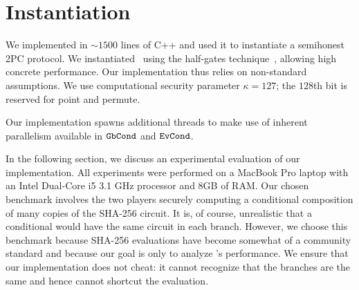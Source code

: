 \section{Instantiation}\label{sec:instantiation}

We implemented  \ourscheme in $\sim1500$ lines of C++ and used it to instantiate a semihonest 2PC protocol.
We instantiated \underscheme\ using the half-gates
technique~\cite{EC:ZahRosEva15}, allowing high
concrete performance.
Our implementation thus relies on non-standard assumptions.
%
We use computational security parameter $\kappa=127$; the $128$th bit is reserved for point and permute.

Our implementation spawns additional threads to make use of inherent
parallelism available in $\mathtt{GbCond}$ and $\mathtt{EvCond}$.

In the following section, we discuss an experimental evaluation of our
implementation.
All experiments were performed on a MacBook Pro laptop with an Intel
Dual-Core i5 3.1 GHz processor and 8GB of RAM.
%
Our chosen benchmark involves the two players securely computing a
conditional composition of many copies of the SHA-256 circuit.
%
It is, of course, unrealistic that a conditional would have the same
circuit in each branch. However, we choose this benchmark because
SHA-256 evaluations have become somewhat of a community standard and because our
goal is only to analyze \ourschemelong's performance.
%
We ensure that our implementation does not cheat: it cannot recognize
that the branches are the same and hence cannot shortcut the evaluation.
